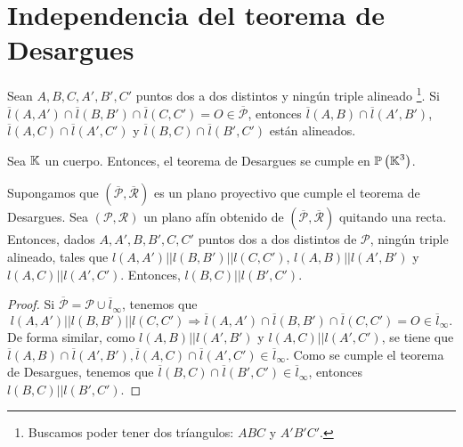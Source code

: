 \section{Independencia del teorema de Desargues}
\begin{theorem}
Sean $\displaystyle A,B,C,A', B', C' $ puntos dos a dos distintos y ningún triple alineado \footnote{Buscamos poder tener dos tríangulos: $\displaystyle ABC $ y $\displaystyle A'B'C' $.}. Si $\displaystyle \overline{l}\left(A,A'\right) \cap \overline{l}\left(B,B'\right)\cap \overline{l}\left(C,C'\right) = O \in \overline{\mathcal{P}} $, entonces $\displaystyle \overline{l}\left(A,B\right) \cap \overline{l}\left(A',B'\right) $, $\displaystyle \overline{l}\left(A,C\right) \cap \overline{l}\left(A',C'\right) $ y $\displaystyle \overline{l}\left(B,C\right) \cap \overline{l}\left(B',C'\right) $ están alineados.
\end{theorem}
\begin{theorem}
Sea $\displaystyle \mathbb{K} $ un cuerpo. Entonces, el teorema de Desargues se cumple en $\displaystyle \mathbb{P}\left(\mathbb{K}^{3}\right) $.
\end{theorem}
\begin{prop}
Supongamos que $\displaystyle \left(\overline{\mathcal{P}}, \overline{\mathcal{R}}\right) $ es un plano proyectivo que cumple el teorema de Desargues. Sea $\displaystyle \left(\mathcal{P}, \mathcal{R}\right) $ un plano afín obtenido de $\displaystyle \left(\overline{\mathcal{P}}, \overline{\mathcal{R}}\right) $ quitando una recta. Entonces, dados $\displaystyle A,A',B,B',C,C'  $ puntos dos a dos distintos de $\displaystyle \mathcal{P} $, ningún triple alineado, tales que $\displaystyle l\left(A,A'\right) | | l\left(B, B'\right) | | l\left(C,C'\right) $, $\displaystyle l\left(A,B\right) | | l\left(A',B'\right) $ y $\displaystyle l\left(A,C\right) | | l\left(A',C'\right) $. Entonces, $\displaystyle l\left(B,C\right) | | l\left(B',C'\right) $.
\end{prop}
\begin{proof}
Si $\displaystyle \overline{\mathcal{P}} = \mathcal{P} \cup \overline{l}_{\infty} $, tenemos que 
\[l\left(A,A'\right) | | l\left(B,B'\right) | | l\left(C,C'\right) \Rightarrow \overline{l}\left(A,A'\right) \cap \overline{l}\left(B,B'\right) \cap \overline{l}\left(C,C'\right) = O \in \overline{l}_{\infty} .\]
De forma similar, como $\displaystyle l\left(A,B\right) | | l\left(A', B'\right) $ y $\displaystyle l\left(A,C\right) | | l\left(A',C'\right) $, se tiene que $\displaystyle \overline{l}\left(A,B\right) \cap \overline{l}\left(A',B'\right), \overline{l}\left(A,C\right)\cap \overline{l}\left(A',C'\right) \in \overline{l}_{\infty} $. Como se cumple el teorema de Desargues, tenemos que $\displaystyle \overline{l}\left(B,C\right) \cap \overline{l}\left(B',C'\right) \in \overline{l}_{\infty} $, entonces $\displaystyle l\left(B,C\right) | | l\left(B',C'\right) $.
\end{proof}

